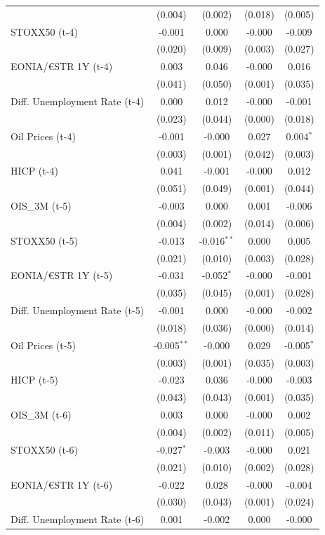 \begin{longtable}[t]{lcccc}
 & (0.004) & (0.002) & (0.018) & (0.005)\\
STOXX50 (t-4) & -0.001 & 0.000 & -0.000 & -0.009\\
 & (0.020) & (0.009) & (0.003) & (0.027)\\
EONIA/€STR 1Y (t-4) & 0.003 & 0.046 & -0.000 & 0.016\\
 & (0.041) & (0.050) & (0.001) & (0.035)\\
Diff. Unemployment Rate (t-4) & 0.000 & 0.012 & -0.000 & -0.001\\
 & (0.023) & (0.044) & (0.000) & (0.018)\\
Oil Prices (t-4) & -0.001 & -0.000 & 0.027 & 0.004$^{*}$\\
 & (0.003) & (0.001) & (0.042) & (0.003)\\
HICP (t-4) & 0.041 & -0.001 & -0.000 & 0.012\\
 & (0.051) & (0.049) & (0.001) & (0.044)\\
OIS\_3M (t-5) & -0.003 & 0.000 & 0.001 & -0.006\\
 & (0.004) & (0.002) & (0.014) & (0.006)\\
STOXX50 (t-5) & -0.013 & -0.016$^{**}$ & 0.000 & 0.005\\
 & (0.021) & (0.010) & (0.003) & (0.028)\\
EONIA/€STR 1Y (t-5) & -0.031 & -0.052$^{*}$ & -0.000 & -0.001\\
 & (0.035) & (0.045) & (0.001) & (0.028)\\
Diff. Unemployment Rate (t-5) & -0.001 & 0.000 & -0.000 & -0.002\\
 & (0.018) & (0.036) & (0.000) & (0.014)\\
Oil Prices (t-5) & -0.005$^{**}$ & -0.000 & 0.029 & -0.005$^{*}$\\
 & (0.003) & (0.001) & (0.035) & (0.003)\\
HICP (t-5) & -0.023 & 0.036 & -0.000 & -0.003\\
 & (0.043) & (0.043) & (0.001) & (0.035)\\
OIS\_3M (t-6) & 0.003 & 0.000 & -0.000 & 0.002\\
 & (0.004) & (0.002) & (0.011) & (0.005)\\
STOXX50 (t-6) & -0.027$^{*}$ & -0.003 & -0.000 & 0.021\\
 & (0.021) & (0.010) & (0.002) & (0.028)\\
EONIA/€STR 1Y (t-6) & -0.022 & 0.028 & -0.000 & -0.004\\
 & (0.030) & (0.043) & (0.001) & (0.024)\\
Diff. Unemployment Rate (t-6) & 0.001 & -0.002 & 0.000 & -0.000\\

\end{longtable}
